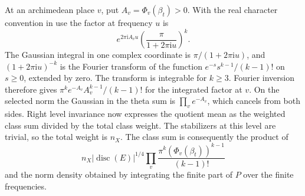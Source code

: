 At an archimedean place \(v\), put \(A_v=\Phi_v(\beta_t)>0\).
With the real character convention in use the factor at frequency \(u\) is
\[
 e^{2\pi\mathrm i A_v u}
       \left(\frac{\pi}{1+2\pi\mathrm i u}\right)^k .
\]
The Gaussian integral in one complex coordinate is
\(\pi/(1+2\pi\mathrm i u)\), and \((1+2\pi\mathrm i u)^{-k}\) is the
Fourier transform of the function \(e^{-s}s^{k-1}/(k-1)!\) on
\(s\ge0\), extended by zero. The transform is integrable for \(k\ge3\).
Fourier inversion therefore gives
\(\pi^k e^{-A_v}A_v^{k-1}/(k-1)!\) for the integrated factor at \(v\).
On the selected norm the Gaussian in the theta sum is
\(\prod_v e^{-A_v}\), which cancels from both sides.
Right level invariance now expresses the quotient mean as the weighted
class sum divided by the total class weight. The stabilizers at this level
are trivial, so the total weight is \(n_X\). The class sum is consequently
the product of
\[
 n_X|\operatorname{disc}(E)|^{1/4}
       \prod_v\frac{\pi^k(\Phi_v(\beta_t))^{k-1}}{(k-1)!}
\]
and the norm density obtained by integrating the finite part of \(P\)
over the finite frequencies.

